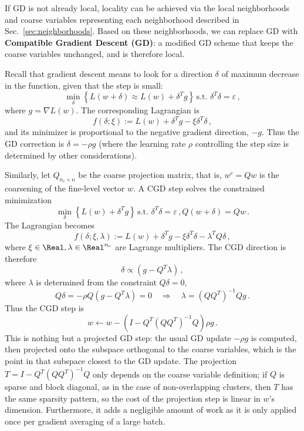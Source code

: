 \documentclass{article} %
\begin{document}
If GD is not already local, locality can be achieved via the local neighborhoods and coarse variables representing each neighborhood described in Sec.~\ref{sec:neighborhoods}. Based on these neighborhoods, we can replace GD with \textbf{Compatible Gradient Descent (GD)}: a modified GD scheme that keeps the coarse variables unchanged, and is therefore local.

Recall that gradient descent means to look for a direction $\delta$ of maximum decrease in the function, given that the step is small: 
\begin{equation}
	\min_{\delta} \left\{ L(w + \delta) \approx  L(w) + \delta^T g \right\}\, {\mbox{s.t. }} \delta^T \delta = \varepsilon\,,
\end{equation}
where $g = \nabla L(w)$. The corresponding Lagrangian is
$$
  f(\delta; \xi) := L(w) + \delta^T g - \xi \delta^T \delta\,,
$$
and its minimizer is proportional to the negative gradient direction, $-g$. Thus the GD correction is $\delta = -\rho g$ (where the learning rate $\rho$ controlling the step size is determined by other considerations).

Similarly, let $Q_{n_c \times n}$ be the coarse projection matrix, that is, $w^c = Q w$ is the coarsening of the fine-level vector $w$. A CGD step solves the constrained minimization
\begin{equation}
	\min_{\delta} \left\{L(w) + \delta^T g \right\} \, {\mbox{s.t. }} \delta^T \delta = \varepsilon\,, Q (w + \delta) = Q w\,.
\end{equation}
The Lagrangian becomes
$$
	f(\delta; \xi, \lambda) := L(w) + \delta^T g - \xi \delta^T \delta - \lambda^T Q \delta\,,
$$
where $\xi \in \Real, \lambda \in \Real^{n_c}$ are Lagrange multipliers. The CGD direction is therefore
$$
	\delta \propto \left( g - Q^T \lambda \right)\,,
$$
where $\lambda$ is determined from the constraint $Q \delta = 0$,
$$
	Q \delta = - \rho Q \left(g - Q^T \lambda \right) = 0 \quad \Longrightarrow \quad  \lambda = \left(Q Q^T\right)^{-1} Q g\,.
$$
Thus the CGD step is
\begin{equation}
	w \longleftarrow w - \left( I - Q^T \left( Q Q^T\right)^{-1} Q \right) \rho g\,.
	\label{cgd_step}
\end{equation}
This is nothing but a projected GD step: the usual GD update $- \rho g$ is computed, then projected onto the subspace orthogonal to the coarse variables, which is the point in that subspace closest to the GD update. The projection $T = I - Q^T (Q Q^T)^{-1} Q$ only depends on the coarse variable definition; if $Q$ is sparse and block diagonal, as in the case of non-overlapping clusters, then $T$ has the same sparsity pattern, so the cost of the projection step is linear in $w$'s dimension. Furthermore, it adds a negligible amount of work as it is only applied once per gradient averaging of a large batch.
\end{document}
